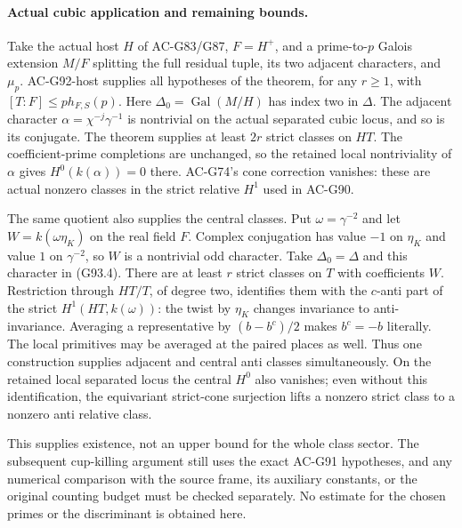 \paragraph{Actual cubic application and remaining bounds.}
Take the actual host \(H\) of AC-G83/G87, \(F=H^+\), and a
prime-to-\(p\) Galois extension \(M/F\) splitting the full residual
tuple, its two adjacent characters, and \(\mu_p\).
AC-G92-host supplies all hypotheses of the theorem, for any
\(r\geq1\), with \([T:F]\leq p h_{F,S}(p)\).
Here \(\Delta_0=\operatorname{Gal}(M/H)\) has index two in
\(\Delta\).  The adjacent character
\(\alpha=\chi^{-j}\gamma^{-1}\) is nontrivial on the actual
separated cubic locus, and so is its conjugate.
The theorem supplies at least \(2r\) strict classes on \(HT\).
The coefficient-prime completions are unchanged, so the retained
local nontriviality of \(\alpha\) gives \(H^0(k(\alpha))=0\)
there.  AC-G74's cone correction vanishes: these are actual
nonzero classes in the strict relative \(H^1\) used in AC-G90.

The same quotient also supplies the central classes.  Put
\(\omega=\gamma^{-2}\) and let
\(W=k(\omega\eta_K)\) on the real field \(F\).
Complex conjugation has value \(-1\) on \(\eta_K\) and value
\(1\) on \(\gamma^{-2}\), so \(W\) is a nontrivial odd character.
Take \(\Delta_0=\Delta\) and this character in (G93.4).
There are at least \(r\) strict classes on \(T\) with coefficients
\(W\).  Restriction through \(HT/T\), of degree two, identifies
them with the \(c\)-anti part of the strict
\(H^1(HT,k(\omega))\): the twist by \(\eta_K\) changes invariance
to anti-invariance.  Averaging a representative by
\((b-b^c)/2\) makes \(b^c=-b\) literally.
The local primitives may be averaged at the paired places as well.
Thus one construction supplies adjacent and central anti classes
simultaneously.  On the retained local separated locus the central
\(H^0\) also vanishes; even without this identification, the
equivariant strict-cone surjection lifts a nonzero strict class to
a nonzero anti relative class.

This supplies existence, not an upper bound for the whole class
sector.  The subsequent cup-killing argument still uses the exact
AC-G91 hypotheses, and any numerical comparison with the source
frame, its auxiliary constants, or the original counting budget
must be checked separately.  No estimate for the chosen primes
or the discriminant is obtained here.

